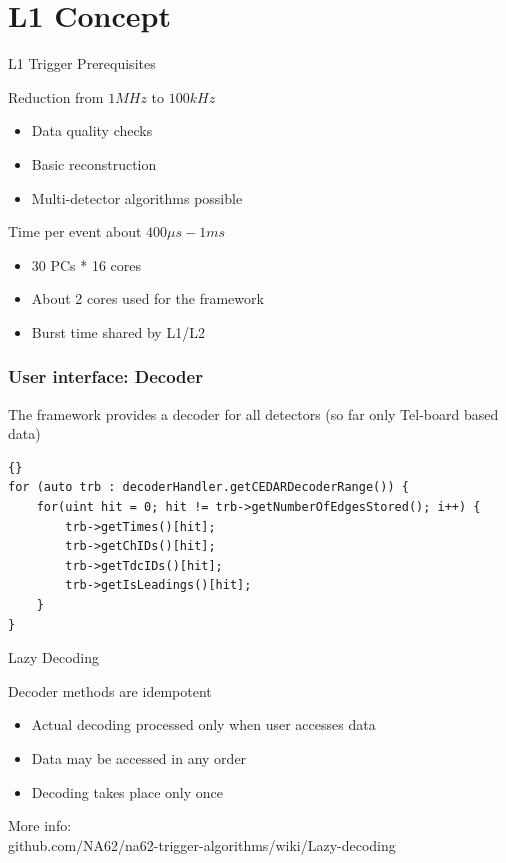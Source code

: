 \section*{L1 Concept}

\begin{frame}{L1 Trigger Prerequisites}{}
	\begin{block}{Reduction from $1 MHz$ to $100 kHz$}
		\begin{itemize}
	  		\item Data quality checks
	  		\item Basic reconstruction
	  		\item Multi-detector algorithms possible
		\end{itemize}
	\end{block}
	
	\begin{exampleblock}{Time per event about $400\mu s - 1 ms$}
		\begin{itemize}
	  		\item 30 PCs * 16 cores
	  		\item About 2 cores used for the framework
	  		\item Burst time shared by L1/L2 
		\end{itemize}
	\end{exampleblock}
\end{frame}


\begin{frame}[fragile]
\frametitle{User interface: Decoder}
The framework provides a decoder for all detectors (so far only Tel-board based
data)

\begin{lstlisting}[frame=trBL,caption={}]{}
for (auto trb : decoderHandler.getCEDARDecoderRange()) {
    for(uint hit = 0; hit != trb->getNumberOfEdgesStored(); i++) {
        trb->getTimes()[hit];
        trb->getChIDs()[hit];
        trb->getTdcIDs()[hit];
        trb->getIsLeadings()[hit];
    }
}
\end{lstlisting}	
\end{frame}

\begin{frame}{Lazy Decoding}{}
	\begin{block}{Decoder methods are idempotent}
		\begin{itemize}
	  		\item Actual decoding processed only when user accesses data
	  		\item Data may be accessed in any order
	  		\item Decoding takes place only once
		\end{itemize}
	\end{block}
	\vspace{0.5cm}
	More info: \\
	github.com/NA62/na62-trigger-algorithms/wiki/Lazy-decoding
\end{frame}

